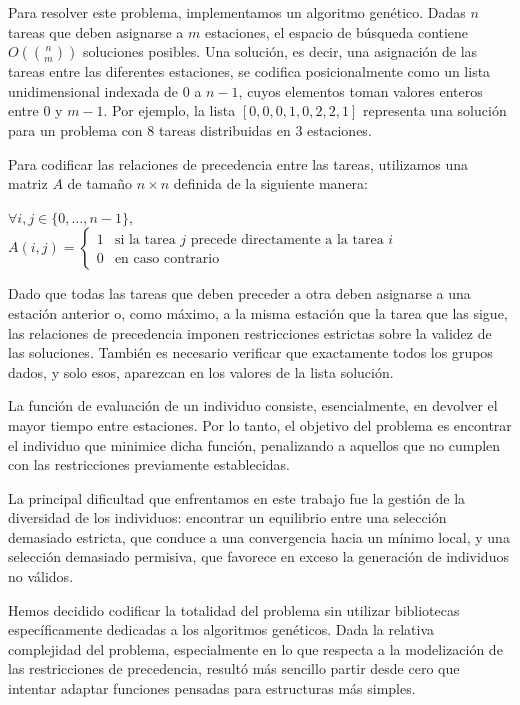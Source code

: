 \documentclass[12pt,a4paper]{report}
\begin{document}
Para resolver este problema, implementamos un algoritmo genético. 
Dadas $n$ tareas que deben asignarse a $m$ estaciones, el espacio de búsqueda contiene $O\left(\binom{n}{m}\right)$ soluciones posibles. 
Una solución, es decir, una asignación de las tareas entre las diferentes estaciones, se codifica posicionalmente como un lista unidimensional indexada de $0$ a $n-1$, 
cuyos elementos toman valores enteros entre $0$ y $m-1$. Por ejemplo, la lista $[0, 0, 0, 1, 0, 2, 2, 1]$ representa una solución para un problema con $8$ tareas distribuidas en $3$ estaciones.

Para codificar las relaciones de precedencia entre las tareas, utilizamos una matriz $A$ de tamaño $n \times n$ definida de la siguiente manera:

$
\forall i,j \in \{0,\dots,n-1\},$
$
A(i,j) = 
\begin{cases}
1 & \text{si la tarea } j \text{ precede directamente a la tarea } i \\
0 & \text{en caso contrario}
\end{cases}
$


Dado que todas las tareas que deben preceder a otra deben asignarse a una estación anterior o, como máximo, a la misma estación que la tarea que las sigue, 
las relaciones de precedencia imponen restricciones estrictas sobre la validez de las soluciones. También es necesario verificar que exactamente todos los grupos dados, y solo esos, aparezcan en los valores de la lista solución.

La función de evaluación de un individuo consiste, esencialmente, en devolver el mayor tiempo entre estaciones. Por lo tanto, el objetivo del problema es encontrar el individuo que minimice dicha función, penalizando a aquellos que no cumplen con las restricciones previamente establecidas.

La principal dificultad que enfrentamos en este trabajo fue la gestión de la diversidad de los individuos: encontrar un equilibrio entre una selección demasiado estricta, que conduce a una convergencia hacia un mínimo local, y una selección demasiado permisiva, que favorece en exceso la generación de individuos no válidos.

Hemos decidido codificar la totalidad del problema sin utilizar bibliotecas específicamente dedicadas a los algoritmos genéticos. Dada la relativa complejidad del problema, especialmente en lo que respecta a la modelización de las restricciones de precedencia, resultó más sencillo partir desde cero que intentar adaptar funciones pensadas para estructuras más simples.
\end{document}
